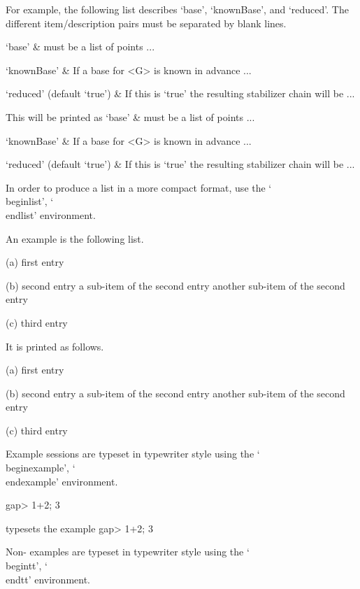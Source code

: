 For example, the   following  list describes   `base', `knownBase',  and
`reduced'.
The different item/description pairs must be separated by blank lines.

\begintt
\beginitems
`base' &
    must be a  list of points ...

`knownBase' &
    If a base for <G> is known in advance ...

`reduced' (default `true') &
    If this is `true' the resulting stabilizer chain will be ...
\enditems
\endtt

This will be printed as
\beginitems
`base' &
    must be a  list of points ...

`knownBase' &
    If a base for <G> is known in advance ...

`reduced' (default `true') &
    If this is `true' the resulting stabilizer chain will be ...
\enditems


In order to produce a list in a more compact format,
use the `\\beginlist', `\\endlist' environment.

An example is the following list.

\begintt
\beginlist
\item{(a)}
    first entry
\item{(b)}
    second entry
\itemitem{--}
    a sub-item of the second entry
\itemitem{--}
    another sub-item of the second entry
\item{(c)}
    third entry
\endlist
\endtt

It is printed as follows.
\beginlist
\item{(a)}
    first entry
\item{(b)}
    second entry
\itemitem{--}
    a sub-item of the second entry
\itemitem{--}
    another sub-item of the second entry
\item{(c)}
    third entry
\endlist

Example {\GAP} sessions are typeset in typewriter style
using the `\\beginexample', `\\endexample' environment.

\begintt
\beginexample
gap> 1+2;
3
\endexample
\endtt

typesets the example
\beginexample
gap> 1+2;
3
\endexample

Non-{\GAP} examples are typeset in typewriter style
using the `\\begintt', `\\endtt' environment.

